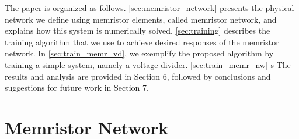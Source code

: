 \documentclass[reprint,superscriptaddress,prb,showkeys]{revtex4-2}
\begin{document}


The paper is organized as follows. \cref{sec:memristor_network} presents the physical network we define using memristor elements, called memristor network, and explains how this system is numerically solved. \cref{sec:training} describes the training algorithm that we use to achieve desired responses of the memristor network. In \cref{sec:train_memr_vd}, we exemplify the proposed algorithm by training a simple system, namely a voltage divider. \cref{sec:train_memr_nw} s The results and analysis are provided in Section 6, followed by conclusions and suggestions for future work in Section 7.

\newpage

\section{\label{sec:memristor_network}Memristor Network}
\end{document}
